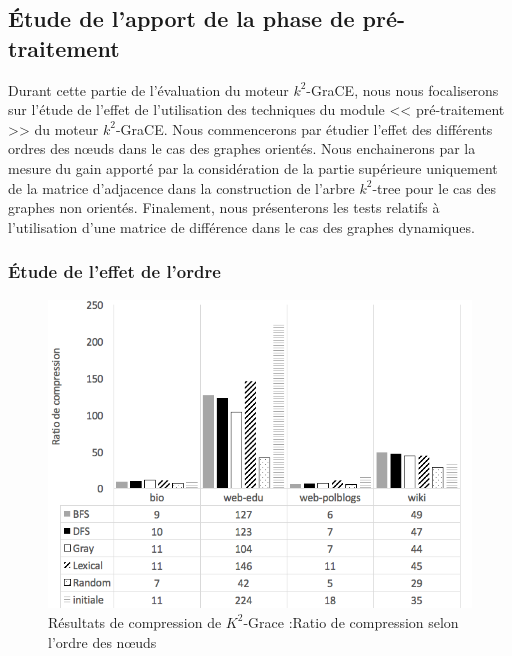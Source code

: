			
 \subsection{Étude de l'apport de la phase de pré-traitement }
 
 Durant cette partie de l'évaluation du moteur $k^2$-GraCE, nous nous focaliserons sur l'étude de l'effet de l'utilisation des techniques du module << pré-traitement >> du moteur $k^2$-GraCE. Nous commencerons par étudier l'effet des différents ordres des nœuds dans le cas des graphes orientés. Nous enchainerons par la mesure du gain apporté par la considération de la partie supérieure uniquement de la matrice d'adjacence dans la construction de l'arbre $k^2$-tree pour le cas des graphes non orientés. Finalement, nous présenterons les tests relatifs à l'utilisation d'une matrice de différence dans le cas des graphes dynamiques.
 			
\subsubsection{Étude de l'effet de l'ordre}

\begin{figure}[H]
	\centering
	\includegraphics[scale=0.65]{ressources/image/Tests/k2-ordre.png}
	\caption{Résultats de compression de $K^2$-Grace :Ratio de compression selon l'ordre des nœuds}
	\label{fig:K2-ordre }
\end{figure}		

